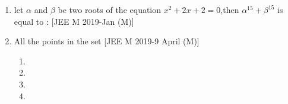\documentclass[journal,12pt,twocolumn,article]{IEEEtran}
\theoremstyle{remark}
\begin{document}
\begin{enumerate}[start = 14]
\item let $\alpha$ and $\beta$ be two roots of the equation $x^2+2x+2=0$,then $\alpha^{15}+\beta^{15}$ is equal to :                                       
\hfill{[JEE M 2019-Jan (M)]}                       
\begin{enumerate}                                   
\end{enumerate}

\item  All the points in the set 
\hfill{[JEE M 2019-9 April (M)]}                    
\begin{enumerate}                                   
                              
\item {}         
                             
\item {}               

\item {}

\item {}

\end{enumerate}
\end{enumerate}
\end{document}
